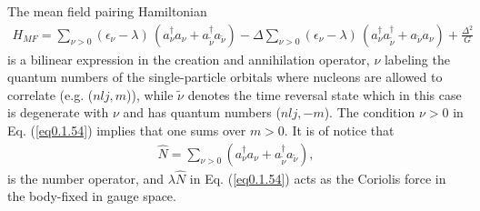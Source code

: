  The mean field pairing Hamiltonian 
\begin{align}\label{eq0.1.54}
H_{MF}=\sum_{\nu>0}(\epsilon_\nu-\lambda)\,(a^\dagger_\nu a_\nu+a^\dagger_{\tilde\nu} a_{\tilde\nu})-\Delta\sum_{\nu>0}(\epsilon_\nu-\lambda)\,(a^\dagger_\nu a^\dagger_{\tilde\nu}+a_{\tilde\nu} a_{\nu})+\frac{\Delta^2}{G}
\end{align}
is a bilinear expression in the creation and annihilation operator, $\nu$ labeling the quantum numbers of the single-particle orbitals where nucleons are allowed to correlate (e.g. ($nlj,m$)), while $\tilde \nu$ denotes the time reversal state which in this case is degenerate with $\nu$ and has quantum numbers ($nlj,-m$). The condition $\nu>0$ in Eq. (\ref{eq0.1.54}) implies that one sums over $m>0$. It is of notice that 
\begin{align}\label{eq0.1.55}
\hat N=\sum_{\nu>0}(a^\dagger_\nu a_\nu+a^\dagger_{\tilde\nu} a_{\tilde\nu}),
\end{align}
is the number operator, and $\lambda \hat N$ in Eq. (\ref{eq0.1.54}) acts as the Coriolis force in the body-fixed in gauge space. 

